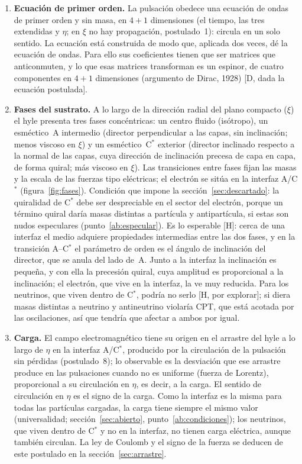 \documentclass[11pt,a4paper]{article}
\newcommand{\st}[1]{\textup{[#1]}}
\newcommand{\Cst}{C\ensuremath{^{*}}}
\begin{document}
\begin{enumerate}[label=\arabic*.,leftmargin=*]
\item \textbf{Ecuación de primer orden.} La pulsación obedece una ecuación de ondas de primer orden y sin masa, en $4+1$ dimensiones (el tiempo, las tres extendidas y $\eta$; en $\xi$ no hay propagación, postulado~1): circula en un solo sentido. La ecuación está construida de modo que, aplicada dos veces, dé la ecuación de ondas. Para ello sus coeficientes tienen que ser matrices que anticonmuten, y lo que esas matrices transforman es un espinor, de cuatro componentes en $4+1$ dimensiones (argumento de Dirac, 1928) \st{D, dada la ecuación postulada}.

\item \textbf{Fases del sustrato.} A lo largo de la dirección radial del plano compacto ($\xi$) el hyle presenta tres fases concéntricas: un centro fluido (isótropo), un esméctico~A intermedio (director perpendicular a las capas, sin inclinación; menos viscoso en $\xi$) y un esméctico~\Cst{} exterior (director inclinado respecto a la normal de las capas, cuya dirección de inclinación precesa de capa en capa, de forma quiral; más viscoso en $\xi$). Las transiciones entre fases fijan las masas y la escala de las fuerzas tipo eléctricas; el electrón se sitúa en la interfaz A/\Cst{} (figura~\ref{fig:fases}). Condición que impone la sección~\ref{sec:descartado}: la quiralidad de \Cst{} debe ser despreciable en el sector del electrón, porque un término quiral daría masas distintas a partícula y antipartícula, si estas son nudos especulares (punto~\ref{ab:especular}). Es lo esperable \st{H}: cerca de una interfaz el medio adquiere propiedades intermedias entre las dos fases, y en la transición A--\Cst{} el parámetro de orden es el ángulo de inclinación del director, que se anula del lado de~A. Junto a la interfaz la inclinación es pequeña, y con ella la precesión quiral, cuya amplitud es proporcional a la inclinación; el electrón, que vive en la interfaz, la ve muy reducida. Para los neutrinos, que viven dentro de \Cst, podría no serlo \st{H, por explorar}; si diera masas distintas a neutrino y antineutrino violaría CPT, que está acotada por las oscilaciones, así que tendría que afectar a ambos por igual.

\item \textbf{Carga.} El campo electromagnético tiene su origen en el arrastre del hyle a lo largo de $\eta$ en la interfaz A/\Cst, producido por la circulación de la pulsación sin pérdidas (postulado~8); lo observable es la desviación que ese arrastre produce en las pulsaciones cuando no es uniforme (fuerza de Lorentz), proporcional a su circulación en $\eta$, es decir, a la carga. El sentido de circulación en $\eta$ es el signo de la carga. Como la interfaz es la misma para todas las partículas cargadas, la carga tiene siempre el mismo valor (universalidad; sección~\ref{sec:abierto}, punto~\ref{ab:condiciones}); los neutrinos, que viven dentro de \Cst{} y no en la interfaz, no tienen carga eléctrica, aunque también circulan. La ley de Coulomb y el signo de la fuerza se deducen de este postulado en la sección~\ref{sec:arrastre}.


\end{enumerate}
\end{document}
